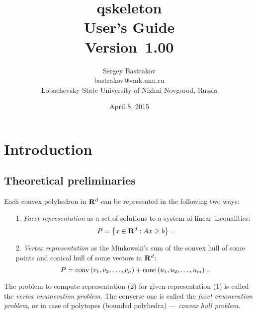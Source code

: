\documentclass{article}
\newcommand{\qskeletonVersion}{{1.00}\xspace}
\newcommand{\qskeletonDate}{April 8, 2015}
\newcommand{\RR}{{\rm\bf R}}
\newcommand{\cone}[1]{\mathop{\rm cone} \left( #1 \right)}
\newcommand{\conv}[1]{\mathop{\rm conv} \left( #1 \right)}
\newcommand{\set}[1]{\left\{ #1\right\}}
\newcommand{\transpose}{^{\top}}
\begin{document}
\title{{\bf qskeleton \\ {\Large User's Guide} \\ {\large Version~\qskeletonVersion}}}

\date{\qskeletonDate}

\author{Sergey Bastrakov \\[0.5em] 
\small bastrakov@vmk.unn.ru \\[0.5em]
\normalsize Lobachevsky State University of Nizhni Novgorod, Russia}

\maketitle


\tableofcontents

\newpage

\newcommand{\AB}{(A\transpose,B\transpose)}%



\section{Introduction}

\subsection{Theoretical preliminaries}

Each convex polyhedron in $\RR^d$ can be represented in the following two ways:
\begin{enumerate}
  \item[1.] {\em Facet representation} as a set of solutions to a system of linear inequalities:
\begin{equation}
P = \set{x \in \RR^d: Ax \geq b} \, .
\end{equation}
  \item[2.] {\em Vertex representation} as the Minkowski's sum of the convex hull of some points and conical hull of some vectors in $\RR^d$:
\begin{equation}
P = \conv{v_1, v_2, \dots, v_n} + \cone{u_1, u_2, \dots, u_m} \, .
\end{equation}
\end{enumerate}

The problem to compute representation (2) for given representation (1) is called the {\em vertex enumeration problem}. The converse one
is called the {\em facet enumeration problem}, or in case of polytopes (bounded polyhedra) --- {\em convex hull problem}.
\end{document}
